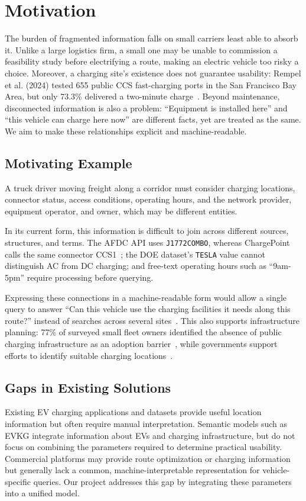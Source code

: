 \documentclass[sigconf]{acmart}
\begin{document}
\section{Motivation}
The burden of fragmented information falls on small carriers least able to absorb it. Unlike a large logistics firm, a small one may be unable to commission a feasibility study before electrifying a route, making an electric vehicle too risky a choice. Moreover, a charging site's existence does not guarantee usability: Rempel et al. (2024) tested 655 public CCS fast-charging ports in the San Francisco Bay Area, but only 73.3\% delivered a two-minute charge~\cite{rempel2024reliability}. Beyond maintenance, disconnected information is also a problem: ``Equipment is installed here'' and ``this vehicle can charge here now'' are different facts, yet are treated as the same. We aim to make these relationships explicit and machine-readable.

\subsection{Motivating Example}
A truck driver moving freight along a corridor must consider charging locations, connector status, access conditions, operating hours, and the network provider, equipment operator, and owner, which may be different entities.

In its current form, this information is difficult to join across different sources, structures, and terms. The AFDC API uses \texttt{J1772COMBO}, whereas ChargePoint calls the same connector CCS1~\cite{afdc_connector_api, chargepoint_connector_types}; the DOE dataset's \texttt{TESLA} value cannot distinguish AC from DC charging; and free-text operating hours such as ``9am-5pm'' require processing before querying.

Expressing these connections in a machine-readable form would allow a single query to answer ``Can this vehicle use the charging facilities it needs along this route?'' instead of searches across several sites~\cite{evkg}. This also supports infrastructure planning: 77\% of surveyed small fleet owners identified the absence of public charging infrastructure as an adoption barrier~\cite{bhardwaj2024fleets}, while governments support efforts to identify suitable charging locations~\cite{nrcan2024rfp}.

\subsection{Gaps in Existing Solutions}
Existing EV charging applications and datasets provide useful location information but often require manual interpretation. Semantic models such as EVKG integrate information about EVs and charging infrastructure, but do not focus on combining the parameters required to determine practical usability. Commercial platforms may provide route optimization or charging information but generally lack a common, machine-interpretable representation for vehicle-specific queries. Our project addresses this gap by integrating these parameters into a unified model.
\end{document}
